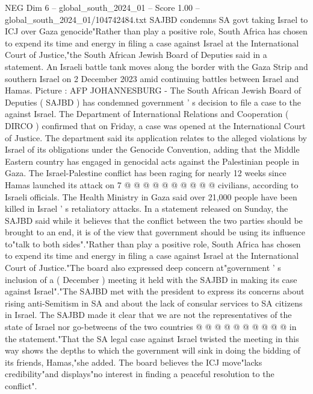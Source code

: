 \begin{textsample}{NEG Dim 6 – global\_south\_2024\_01 – Score 1.00 – global\_south\_2024\_01/104742484.txt}  \label{ex:f6_neg_352}
SAJBD condemns SA govt taking Israel to ICJ over Gaza genocide"Rather than play a positive role, South Africa has chosen to expend its time and energy in filing a case against Israel at the International Court of Justice,"the South African Jewish Board of Deputies said in a statement.
An Israeli battle tank moves along the border with the Gaza Strip and southern Israel on 2 December 2023 amid continuing battles between Israel and Hamas.
Picture : AFP JOHANNESBURG - The South African Jewish Board of Deputies ( SAJBD ) has condemned government ' s decision to file a case to the against Israel.
The Department of International Relations and Cooperation ( DIRCO ) confirmed that on Friday, a case was opened at the International Court of Justice.
The department said its application relates to the alleged violations by Israel of its obligations under the Genocide Convention, adding that the Middle Eastern country has engaged in genocidal acts against the Palestinian people in Gaza.
The Israel-Palestine conflict has been raging for nearly 12 weeks since Hamas launched its attack on 7 @ @ @ @ @ @ @ @ @ @ civilians, according to Israeli officials.
The Health Ministry in Gaza said over 21,000 people have been killed in Israel ' s retaliatory attacks.
In a statement released on Sunday, the SAJBD said while it believes that the conflict between the two parties should be brought to an end, it is of the view that government should be using its influence to"talk to both sides"."Rather than play a positive role, South Africa has chosen to expend its time and energy in filing a case against Israel at the International Court of Justice."The board also expressed deep concern at"government ' s inclusion of a ( December ) meeting it held with the SAJBD in making its case against Israel"."The SAJBD met with the president to express its concerns about rising anti-Semitism in SA and about the lack of consular services to SA citizens in Israel.
The SAJBD made it clear that we are not the representatives of the state of Israel nor go-betweens of the two countries @ @ @ @ @ @ @ @ @ @ in the statement."That the SA legal case against Israel twisted the meeting in this way shows the depths to which the government will sink in doing the bidding of its friends, Hamas,"she added.
The board believes the ICJ move"lacks credibility"and displays"no interest in finding a peaceful resolution to the conflict".

\end{textsample}
